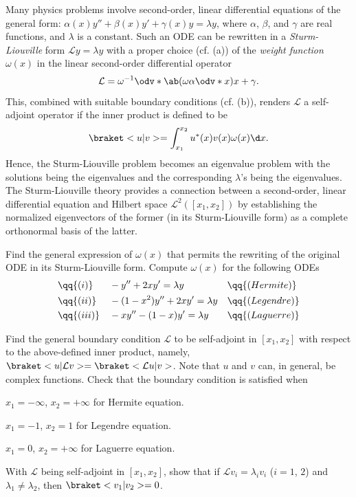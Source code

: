 \newpage

\begin{problem}
  Many physics problems involve second-order, linear differential equations
  of the general form: $\alpha(x) y'' + \beta(x) y' + \gamma(x) y = \lambda y$,
  where $\alpha$, $\beta$, and $\gamma$ are real functions, and $\lambda$ is a constant.
  Such an ODE can be rewritten in a \emph{Sturm-Liouville} form $\mathcal Ly = \lambda y$
  with a proper choice (cf. (a)) of the \emph{weight function} $\omega(x)$ in the linear second-order differential operator
  \[
    \mathcal L = \omega^{-1} \odv*{\ab(\omega \alpha \odv*{}x)}x + \gamma.
  \]
  This, combined with suitable boundary conditions (cf. (b)), renders $\mathcal L$
  a self-adjoint operator if the inner product is defined to be
  \[
    \braket<u|v> = \int_{x_1}^{x_2} u^*(x) v(x) \omega(x) \d x.
  \]
  Hence, the Sturm-Liouville problem becomes an eigenvalue problem with the solutions being the eigenvalues and the corresponding $\lambda$'s being the eigenvalues.
  The Sturm-Liouville theory provides a connection between a second-order, linear differential equation and Hilbert space $\mathcal L^2 ([x_1, x_2])$
  by establishing the normalized eigenvectors of the former (in its Sturm-Liouville form) as a complete orthonormal basis of the latter.
  \begin{enumext}
    \item Find the general expression of $\omega(x)$ that permits the rewriting of the original ODE in its Sturm-Liouville form.
    Compute $\omega(x)$ for the following ODEs
    \begin{alignat*}{4}
      & \qq{(i)}   && -y'' + 2xy' = \lambda y         && \qq{(Hermite)}\\
      & \qq{(ii)}  && -(1 - x^2)y''+ 2xy' = \lambda y && \qq{(Legendre)}\\
      & \qq{(iii)} && -xy'' - (1 - x)y' = \lambda y   && \qq{(Laguerre)}
    \end{alignat*}
    \item Find the general boundary condition $\mathcal L$
    to be self-adjoint in $[x_1, x_2]$ with respect to the above-defined inner product,
    namely, $\braket<u|\mathcal Lv> = \braket<\mathcal Lu|v>$.
    Note that $u$ and $v$ can, in general, be complex functions.
    Check that the boundary condition is satisfied when
    \begin{enumext}
      \item $x_1 = -\infty$, $x_2 = +\infty$ for Hermite equation.
      \item $x_1 = -1$, $x_2 = 1$ for Legendre equation.
      \item $x_1 = 0$, $x_2 = +\infty$ for Laguerre equation.
    \end{enumext}
    \item With $\mathcal L$ being self-adjoint in $[x_1, x_2]$, show that if
    $\mathcal Lv_i = \lambda_i v_i$ ($i = 1$, $2$) and $\lambda_1 \neq \lambda_2$,
    then $\braket<v_1|v_2> = 0$.
  \end{enumext}
\end{problem}
